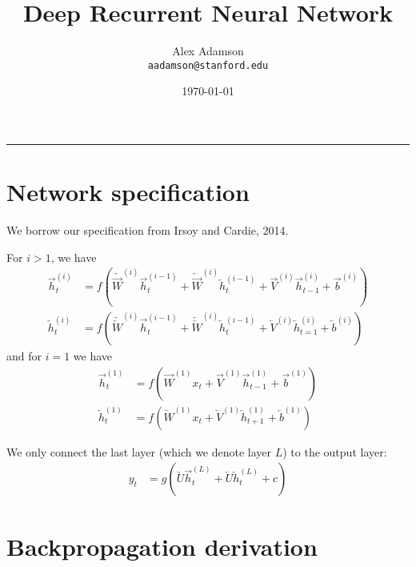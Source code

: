 \documentclass[12pt]{article}
\title{Deep Recurrent Neural Network}
\author{Alex Adamson \\ \texttt{aadamson@stanford.edu}}
\date{\today}
\begin{document}
  \maketitle

  \vspace{-0.3in}
  \rule{\linewidth}{0.4pt}


  \section{Network specification}

    We borrow our specification from Irsoy and Cardie, 2014.

    For $i > 1$, we have
    \begin{align}
      \overrightarrow{h}_t^{(i)} &= f(\underrightarrow{\overrightarrow{W}}^{(i)} \overrightarrow{h}_t^{(i-1)} + \underleftarrow{\overrightarrow{W}}^{(i)} \overleftarrow{h}_t^{(i-1)} + \overrightarrow{V}^{(i)} \overrightarrow{h}_{t-1}^{(i)} + \overrightarrow{b}^{(i)}) \\
      \overleftarrow{h}_t^{(i)} &= f(\underrightarrow{\overleftarrow{W}}^{(i)} \overrightarrow{h}_t^{(i-1)} + \underleftarrow{\overleftarrow{W}}^{(i)} \overleftarrow{h}_t^{(i-1)} + \overleftarrow{V}^{(i)} \overleftarrow{h}_{t=1}^{(i)} + \overleftarrow{b}^{(i)})
    \end{align}
    and for $i = 1$ we have
    \begin{align}
      \overrightarrow{h}_t^{(1)} &= f(\overrightarrow{W}^{(1)} x_t + \overrightarrow{V}^{(1)} \overrightarrow{h}_{t-1}^{(1)} + \overrightarrow{b}^{(1)}) \\
      \overleftarrow{h}_t^{(1)} &= f(\overleftarrow{W}^{(1)} x_t + \overleftarrow{V}^{(1)} \overleftarrow{h}_{t+1}^{(1)} + \overleftarrow{b}^{(1)})
    \end{align}

    We only connect the last layer (which we denote layer $L$) to the output layer:
    \begin{align}
      y_t &= g(\underrightarrow{U} \overrightarrow{h}_{t}^{(L)} + \underleftarrow{U} \overleftarrow{h}_{t}^{(L)} + c)
    \end{align}

  \section{Backpropagation derivation}
\end{document}
